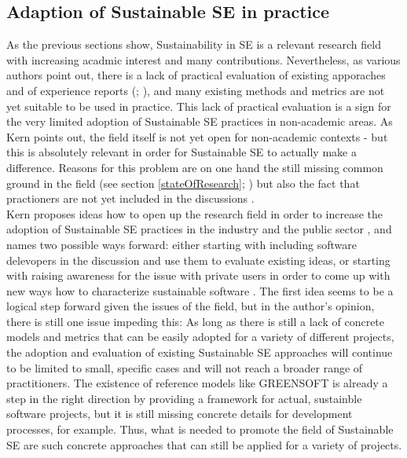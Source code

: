 \documentclass[oribibl]{llncs}
\begin{document}
\subsection{Adaption of Sustainable SE in practice}%
As the previous sections show, Sustainability in SE is a relevant research field with increasing acadmic interest and many contributions. Nevertheless, as various authors point out, there is a lack of practical evaluation of existing apporaches and of experience reports (\cite{penzenstadler_sustainability_2012}; \cite{penzenstadler_systematic_2014}), and many existing methods and metrics are not yet suitable to be used in practice. %
This lack of practical evaluation is a sign for the very limited adoption of Sustainable SE practices in non-academic areas. As Kern \cite{kern_how_2016} points out, the field itself is not yet open for non-academic contexts - but this is absolutely relevant in order for Sustainable SE to actually make a difference. Reasons for this problem are on one hand the still missing common ground in the field (see section \ref{stateOfResearch}; \cite{kern_how_2016}) but also the fact that practioners are not yet included in the discussions \cite{kern_how_2016}.\\
Kern proposes ideas how to open up the research field in order to increase the adoption of Sustainable SE practices in the industry and the public sector \cite{kern_how_2016}, and names two possible ways forward: either starting with including software delevopers in the discussion and use them to evaluate existing ideas, or starting with raising awareness for the issue with private users in order to come up with new ways how to characterize sustainable software \cite{kern_how_2016}. The first idea seems to be a logical step forward given the issues of the field, but in the author's opinion, there is still one issue impeding this: As long as there is still a lack of concrete models and metrics that can be easily adopted for a variety of different projects, the adoption and evaluation of existing Sustainable SE approaches will continue to be limited to small, specific cases and will not reach a broader range of practitioners. The existence of reference models like GREENSOFT is already a step in the right direction by providing a framework for actual, sustainble software projects, but it is still missing concrete details for development processes, for example. Thus, what is needed to promote the field of Sustainable SE are such concrete approaches that can still be applied for a variety of projects. %
\end{document}
